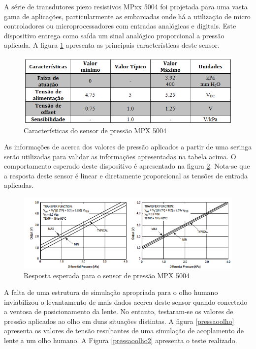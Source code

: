A série de transdutores piezo resistivos MPxx 5004 foi projetada para uma vasta gama de aplicações, particularmente as embarcadas onde há a utilização de micro controladores ou microprocessadores com entradas analógicas e digitais. Este dispositivo entrega como saída um sinal analógico proporcional a pressão aplicada. A figura \ref{sensor5004} apresenta as principais características deste sensor.

\begin{figure}[H]
		\centering
			\includegraphics[scale=1.0]{figuras/sensor5004.png}
		\caption{Características do sensor de pressão MPX 5004}
		\label{sensor5004}
\end{figure}

As informações de acerca dos valores de pressão aplicados a partir de uma seringa serão utilizadas para validar as informações apresentadas na tabela acima. O comportamento esperado deste dispositivo é apresentado na figura \ref{respostasensor5004}. Nota-se que a resposta deste sensor é linear e diretamente proporcional as tensões de entrada aplicadas.

\begin{figure}[H]
		\centering
			\includegraphics[scale=0.8]{figuras/respostasensor5004.png}
		\caption{Resposta esperada para o sensor de pressão MPX 5004}
		\label{respostasensor5004}
\end{figure}

A falta de uma estrutura de simulação apropriada para o olho humano inviabilizou o levantamento de mais dados acerca deste sensor quando conectado a ventosa de posicionamento da lente. No entanto, testaram-se os valores de pressão aplicados ao olho em duas situações distintas. A figura \ref{pressaoolho} apresenta os valores de tensão resultantes de uma simulação de acoplamento de lente a um olho humano. A Figura \ref{pressaoolho2} apresenta o teste realizado.


